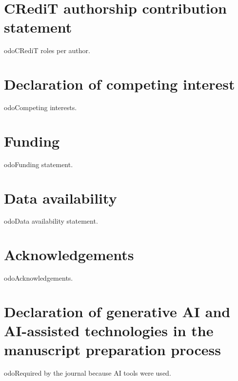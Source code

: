 \section*{CRediT authorship contribution statement}
	odo{CRediT roles per author.}

\section*{Declaration of competing interest}
	odo{Competing interests.}

\section*{Funding}
	odo{Funding statement.}

\section*{Data availability}
	odo{Data availability statement.}

\section*{Acknowledgements}
	odo{Acknowledgements.}

\section*{Declaration of generative AI and AI-assisted technologies in the manuscript preparation process}
	odo{Required by the journal because AI tools were used.}
